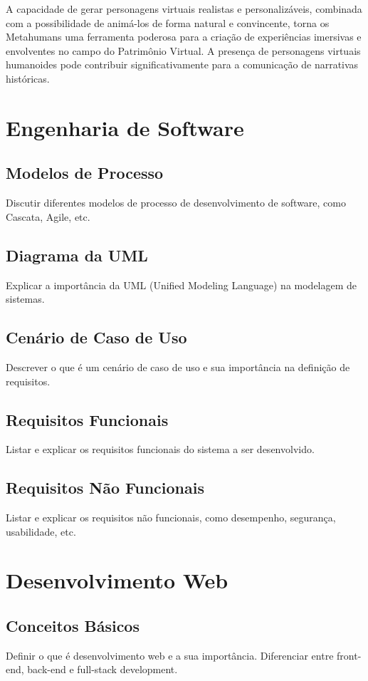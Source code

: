 A capacidade de gerar personagens virtuais realistas e personalizáveis, combinada com a possibilidade de animá-los de forma natural e convincente, torna os Metahumans uma ferramenta poderosa para a criação de experiências imersivas e envolventes no campo do Patrimônio Virtual. A presença de personagens virtuais humanoides pode contribuir significativamente para a comunicação de narrativas históricas.

\section{Engenharia de Software}
\subsection{Modelos de Processo}
Discutir diferentes modelos de processo de desenvolvimento de software, como Cascata, Agile, etc.

\subsection{Diagrama da UML}
Explicar a importância da UML (Unified Modeling Language) na modelagem de sistemas.

\subsection{Cenário de Caso de Uso}
Descrever o que é um cenário de caso de uso e sua importância na definição de requisitos.

\subsection{Requisitos Funcionais}
Listar e explicar os requisitos funcionais do sistema a ser desenvolvido.

\subsection{Requisitos Não Funcionais}
Listar e explicar os requisitos não funcionais, como desempenho, segurança, usabilidade, etc.

\section{Desenvolvimento Web}
\subsection{Conceitos Básicos}
Definir o que é desenvolvimento web e a sua importância. Diferenciar entre front-end, back-end e full-stack development.

